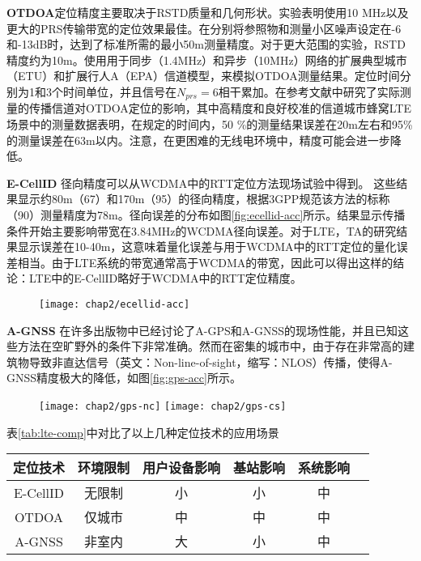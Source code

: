 \textbf{OTDOA}\cite{sun2005signal}定位精度主要取决于RSTD质量和几何形状。实验表明使用10 MHz以及更大的PRS传输带宽的定位效果最佳。在分别将参照物和测量小区噪声设定在-6和-13dB时，达到了标准所需的最小50m测量精度。对于更大范围的实验，RSTD精度约为10m。使用用于同步（1.4MHz）和异步（10MHz）网络的扩展典型城市（ETU）和扩展行人A（EPA）信道模型，来模拟OTDOA测量结果。定位时间分别为1和3个时间单位，并且信号在$N_{prs} = 6$相干累加。在参考文献\cite{medbo2009propagation}中研究了实际测量的传播信道对OTDOA定位的影响，其中高精度和良好校准的信道城市蜂窝LTE场景中的测量数据表明，在规定的时间内，50 \%的测量结果误差在20m左右和95\%的测量误差在63m以内\cite{del2012achievable}。注意，在更困难的无线电环境中，精度可能会进一步降低。

\textbf{E-CellID} 径向精度可以从WCDMA中的RTT定位方法现场试验中得到\cite{wennervirta2010rtt}。 这些结果显示约80m（67\％）和170m（95\％）的径向精度，根据3GPP规范该方法的标称（90\％）测量精度为78m。径向误差的分布如图\ref{fig:ecellid-acc}所示。结果显示传播条件开始主要影响带宽在3.84MHz的WCDMA径向误差。对于LTE，TA的研究结果显示误差在10-40m，这意味着量化误差与用于WCDMA中的RTT定位的量化误差相当。由于LTE系统的带宽通常高于WCDMA的带宽，因此可以得出这样的结论：LTE中的E-CellID略好于WCDMA中的RTT定位精度。

\begin{figure}[!htp]
    \centering
    \texttt{[image: chap2/ecellid-acc]}
\end{figure}

\textbf{A-GNSS} 在许多出版物中已经讨论了A-GPS和A-GNSS的现场性能，并且已知这些方法在空旷野外的条件下非常准确。然而在密集的城市中，由于存在非常高的建筑物导致非直达信号（英文：Non-line-of-sight，缩写：NLOS）传播，使得A-GNSS精度极大的降低，如图\ref{fig:gps-acc}所示。

\begin{figure}[!htp]
  \centering
  \texttt{[image: chap2/gps-nc]}
  \hspace{1cm}
  \texttt{[image: chap2/gps-cs]}
\end{figure}

表\ref{tab:lte-comp}中对比了以上几种定位技术的应用场景
\begin{table}[!hpb]
    \centering
    \begin{tabular}{@{}cccccc@{}} \toprule
        定位技术 & 环境限制 & 用户设备影响 & 基站影响 & 系统影响 \\ \midrule
        E-CellID & 无限制 & 小 & 小 & 中 \\
        OTDOA & 仅城市 & 中 & 中 & 中 \\
        A-GNSS & 非室内 & 大 & 小 & 中 \\ \bottomrule
    \end{tabular}
\end{table}

